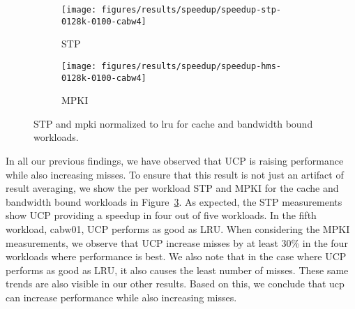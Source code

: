\begin{figure}[th]
    \centering
    \begin{subfigure}[b]{0.5\textwidth}
        \texttt{[image: figures/results/speedup/speedup-stp-0128k-0100-cabw4]}
        \caption{STP}
        \label{fig:results:base:cabw:stp}
    \end{subfigure}%
    \begin{subfigure}[b]{0.5\textwidth}
        \texttt{[image: figures/results/speedup/speedup-hms-0128k-0100-cabw4]}
        \caption{MPKI}
        \label{fig:results:base:cabw:mpki}
    \end{subfigure}
    \caption[cabw workloads result]{STP and \gls{mpki} normalized to \gls{lru} for cache and bandwidth bound workloads.}
    \label{fig:results:base:cabw} 
\end{figure}

In all our previous findings, we have observed that UCP is raising performance while also increasing misses.
To ensure that this result is not just an artifact of result averaging, we show the per workload STP and MPKI for the cache and bandwidth bound workloads in Figure~\ref{fig:results:base:cabw}.
As expected, the STP measurements show UCP providing a speedup in four out of five workloads.
In the fifth workload, cabw01, UCP performs as good as LRU.
When considering the MPKI measurements, we observe that UCP increase misses by at least 30\% in the four workloads where performance is best.
We also note that in the case where UCP performs as good as LRU, it also causes the least number of misses.
These same trends are also visible in our other results.
Based on this, we conclude that \gls{ucp} can increase performance while also increasing misses.
